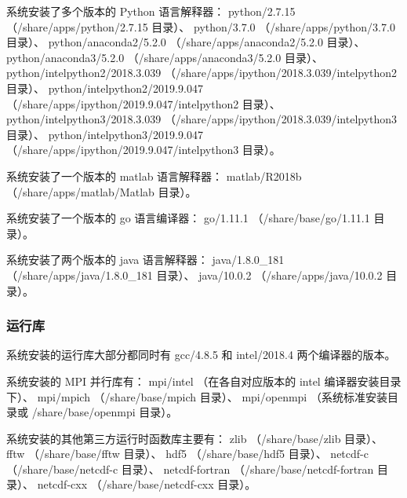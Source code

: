 \documentclass[UTF8]{ctexart}
\begin{document}
系统安装了多个版本的 Python 语言解释器：\newline
python/2.7.15 （/share/apps/python/2.7.15 目录）、\newline
python/3.7.0 （/share/apps/python/3.7.0 目录）、\newline
python/anaconda2/5.2.0 （/share/apps/anaconda2/5.2.0 目录）、\newline
python/anaconda3/5.2.0 （/share/apps/anaconda3/5.2.0 目录）、\newline
python/intelpython2/2018.3.039 （/share/apps/ipython/2018.3.039/intelpython2 目录）、\newline
python/intelpython2/2019.9.047 （/share/apps/ipython/2019.9.047/intelpython2 目录）、\newline
python/intelpython3/2018.3.039 （/share/apps/ipython/2018.3.039/intelpython3 目录）、\newline
python/intelpython3/2019.9.047 （/share/apps/ipython/2019.9.047/intelpython3 目录）。
\bigskip

系统安装了一个版本的 matlab 语言解释器：\newline
matlab/R2018b （/share/apps/matlab/Matlab 目录）。
\bigskip

系统安装了一个版本的 go 语言编译器：\newline
go/1.11.1 （/share/base/go/1.11.1 目录）。
\bigskip

系统安装了两个版本的 java 语言解释器：\newline
java/1.8.0\_181 （/share/apps/java/1.8.0\_181 目录）、\newline
java/10.0.2 （/share/apps/java/10.0.2 目录）。

\subsubsection{运行库}
系统安装的运行库大部分都同时有 gcc/4.8.5 和 intel/2018.4 两个编译器的版本。
\bigskip

系统安装的 MPI 并行库有：\newline
mpi/intel （在各自对应版本的 intel 编译器安装目录下）、\newline
mpi/mpich （/share/base/mpich 目录）、\newline
mpi/openmpi （系统标准安装目录或 /share/base/openmpi 目录）。
\bigskip

系统安装的其他第三方运行时函数库主要有：\newline
zlib （/share/base/zlib 目录）、\newline
fftw （/share/base/fftw 目录）、\newline
hdf5 （/share/base/hdf5 目录）、\newline
netcdf-c （/share/base/netcdf-c 目录）、\newline
netcdf-fortran （/share/base/netcdf-fortran 目录）、\newline
netcdf-cxx （/share/base/netcdf-cxx 目录）。
\end{document}
